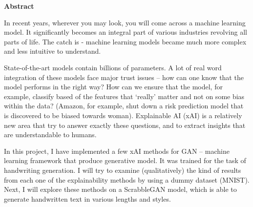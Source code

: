 \thispagestyle{plain}

\textbf{Abstract}

\vspace{1cm}


In recent years, wherever you may look, you will come across a machine learning model. It significantly becomes an integral part of various industries revolving all parts of life.
The catch is - machine learning models became much more complex and less intuitive to understand.

State-of-the-art models contain billions of parameters. A lot of real word integration of these models face major trust issues – how can one know that the model performs in the right way? How can we ensure that the model, for example, classify based of the features that ‘really’ matter and not on some bias within the data? (Amazon, for example, shut down a risk prediction model that is discovered to be biased towards woman).
Explainable AI (xAI) is a relatively new area that try to answer exactly these questions, and to extract insights that are understandable to humans.

In this project, I have implemented a few xAI methods for GAN – machine learning framework that produce generative model. It was trained for the task of handwriting generation. I will try to examine (qualitatively) the kind of results from each one of the explainability methods by using a dummy dataset (MNIST). Next, I will explore these methods on a ScrabbleGAN model, which is able to generate handwritten text in various lengths and styles. 



